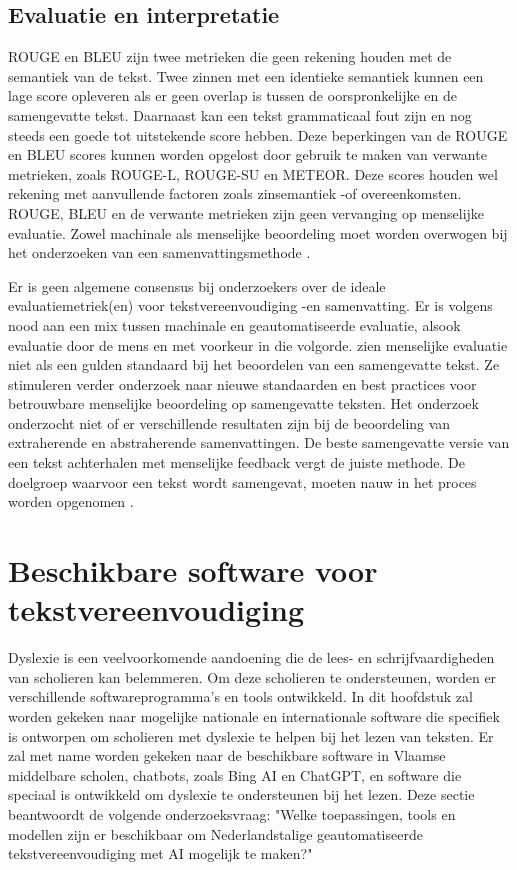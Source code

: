 \subsection{Evaluatie en interpretatie}

ROUGE en BLEU zijn twee metrieken die geen rekening houden met de semantiek van de tekst. Twee zinnen met een identieke semantiek kunnen een lage score opleveren als er geen overlap is tussen de oorspronkelijke en de samengevatte tekst. Daarnaast kan een tekst grammaticaal fout zijn en nog steeds een goede tot uitstekende score hebben. Deze beperkingen van de ROUGE en BLEU scores kunnen worden opgelost door gebruik te maken van verwante metrieken, zoals ROUGE-L, ROUGE-SU en METEOR. Deze scores houden wel rekening met aanvullende factoren zoals zinsemantiek -of overeenkomsten. ROUGE, BLEU en de verwante metrieken zijn geen vervanging op menselijke evaluatie. Zowel machinale als menselijke beoordeling moet worden overwogen bij het onderzoeken van een samenvattingsmethode \autocite{Raj2017, Tatman2019}.

Er is geen algemene consensus bij onderzoekers over de ideale evaluatiemetriek(en) voor tekstvereenvoudiging -en samenvatting. Er is volgens \textcite{Fabbri2020} nood aan een mix tussen machinale en geautomatiseerde evaluatie, alsook evaluatie door de mens en met voorkeur in die volgorde. \textcite{Iskender2021} zien menselijke evaluatie niet als een gulden standaard bij het beoordelen van een samengevatte tekst. Ze stimuleren verder onderzoek naar nieuwe standaarden en best practices voor betrouwbare menselijke beoordeling op samengevatte teksten. Het onderzoek onderzocht niet of er verschillende resultaten zijn bij de beoordeling van extraherende en abstraherende samenvattingen. De beste samengevatte versie van een tekst achterhalen met menselijke feedback vergt de juiste methode. De doelgroep waarvoor een tekst wordt samengevat, moeten nauw in het proces worden opgenomen \autocite{Iskender2021}.


\section{Beschikbare software voor tekstvereenvoudiging}

Dyslexie is een veelvoorkomende aandoening die de lees- en schrijfvaardigheden van scholieren kan belemmeren. Om deze scholieren te ondersteunen, worden er verschillende softwareprogramma's en tools ontwikkeld. In dit hoofdstuk zal worden gekeken naar mogelijke nationale en internationale software die specifiek is ontworpen om scholieren met dyslexie te helpen bij het lezen van teksten. Er zal met name worden gekeken naar de beschikbare software in Vlaamse middelbare scholen, chatbots, zoals Bing AI en ChatGPT, en software die speciaal is ontwikkeld om dyslexie te ondersteunen bij het lezen. Deze sectie beantwoordt de volgende onderzoeksvraag: "Welke toepassingen, tools en modellen zijn er beschikbaar om Nederlandstalige geautomatiseerde tekstvereenvoudiging met AI mogelijk te maken?"


